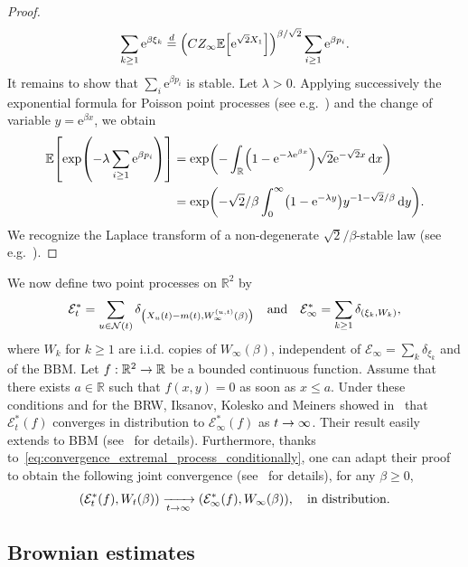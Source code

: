 \documentclass[10pt]{amsart}
\theoremstyle{definition}\newtheorem{defi}[theo]{Definition}\newtheorem{rema}[theo]{Remark}\newtheorem{exam}[theo]{Example}\newtheorem{exem}[theo]{Example}\newtheorem{nota}[theo]{Notation}
\newcommand{\e}{\mathrm{e}}
\renewcommand{\d}[1]{\mathop{}\!\mathrm{d}#1}
\newcommand{\R}{\mathbb{R}}
\newcommand\1{\mathds{1}}
\newcommand{\cE}{\mathcal{E}}
\newcommand{\cN}{\mathcal{N}}
\newcommand{\Expec}[1]{\mathbb{E}\left[#1\right]}
\let\originalleft\left
\let\originalright\right
\renewcommand{\left}{\mathopen{}\mathclose\bgroup\originalleft}
\renewcommand{\right}{\aftergroup\egroup\originalright}
\renewcommand*{\to}{\mathchoice{\longrightarrow}{\rightarrow}{\rightarrow}{\rightarrow}}
\begin{document}
\begin{proof}
\begin{equation*}
\sum_{k \geq 1} \e^{\beta \xi_k} \overset{d}{=} \left(C Z_\infty \Expec{\e^{\sqrt{2} X_1}}\right)^{\beta/\sqrt{2}} \sum_{i \geq 1} \e^{\beta p_i}.
\end{equation*}
It remains to show that $\sum_i \e^{\beta p_i}$ is stable. Let $\lambda > 0$. Applying successively the exponential formula for Poisson point processes (see e.g.~\cite[Section~0.5]{Bertoin1996}) and the change of variable $y = \e^{\beta x}$, we obtain
\begin{align*}
\Expec{\exp\left(-\lambda \sum_{i \geq 1} \e^{\beta p_i}\right)} &= \exp\left(-\int_\R \left(1 - \e^{-\lambda \e^{\beta x}}\right) \sqrt{2} \e^{-\sqrt{2} x} \d{x}\right) \\
&= \exp\left(-\sqrt{2}/\beta \int_0^\infty \left(1 - \e^{-\lambda y}\right) y^{-1-\sqrt{2}/\beta} \d{y}\right).
\end{align*}
We recognize the Laplace transform of a non-degenerate $\sqrt{2}/\beta$-stable law (see e.g.~\cite{Sato1999}).
\end{proof}

We now define two point processes on $\R^2$ by
\begin{equation}
\cE_t^* = \sum_{u \in \cN(t)} \delta_{\left(X_u(t) - m(t), W_\infty^{(u, t)}(\beta)\right)} \quad \text{and} \quad \cE_\infty^* = \sum_{k \geq 1} \delta_{\left(\xi_k, W_k\right)},
\end{equation}
where $W_k$ for $k \geq 1$ are i.i.d. copies of $W_\infty(\beta)$, independent of $\cE_\infty = \sum_{k} \delta_{\xi_k}$ and of the BBM. Let $f : \R^2 \to \R$ be a bounded continuous function. Assume that there exists $a \in \R$ such that $f(x, y) = 0$ as soon as $x \leq a$. Under these conditions and for the BRW, Iksanov, Kolesko and Meiners showed in~\cite[Lemma~5.2]{IksanovKoleskoMeiners2020} that $\cE_t^*(f)$ converges in distribution to $\cE_\infty^*(f)$ as $t \to \infty$. Their result easily extends to BBM (see~\cite[Lemma~5.9]{Chataignier2024} for details). Furthermore, thanks to~\eqref{eq:convergence_extremal_process_conditionally}, one can adapt their proof to obtain the following joint convergence (see~\cite[Remark~5.10]{Chataignier2024} for details), for any $\beta \geq 0$,
\begin{equation}\label{eq:joint_convergence}
(\cE_t^*(f), W_t(\beta)) \xrightarrow[t \to \infty]{} (\cE_\infty^*(f), W_\infty(\beta)), \quad \text{in distribution}.
\end{equation}

\subsection{Brownian estimates}
\end{document}
